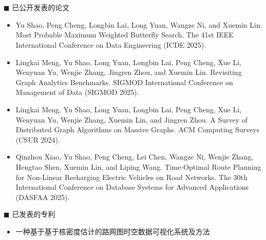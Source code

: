 \chapter*{}
\vskip 5mm

  {\heiti $\blacksquare$ 已公开发表的论文}\vskip 5mm

\begin{itemize}
  \item 
  Yu Shao, Peng Cheng, Longbin Lai, Long Yuan, Wangze Ni, and Xuemin Lin. Most Probable Maximum Weighted Butterfly Search. The 41st IEEE International Conference on Data Engineering (ICDE 2025).

  \item 
  Lingkai Meng, Yu Shao, Long Yuan, Longbin Lai, Peng Cheng, Xue Li, Wenyuan Yu, Wenjie Zhang, Jingren Zhou, and Xuemin Lin. Revisiting Graph Analytics Benchmarks. SIGMOD International Conference on Management of Data (SIGMOD 2025).

  \item 
  Lingkai Meng, Yu Shao, Long Yuan, Longbin Lai, Peng Cheng, Xue Li, Wenyuan Yu, Wenjie Zhang, Xuemin Lin, and Jingren Zhou. A Survey of Distributed Graph Algorithms on Massive Graphs. ACM Computing Surveys (CSUR 2024).

  \item 
  Qinzhou Xiao, Yu Shao, Peng Cheng, Lei Chen, Wangze Ni, Wenjie Zhang, Hengtao Shen, Xuemin Lin, and Liping Wang. Time-Optimal Route Planning for Non-Linear Recharging Electric Vehicles on Road Networks. The 30th International Conference on Database Systems for Advanced Applications (DASFAA 2025).
\end{itemize}

\bigskip\bigskip

{\heiti $\blacksquare$ 已发表的专利}\vskip 5mm

\begin{itemize}
  \item 一种基于基于核密度估计的路网图时空数据可视化系统及方法
\end{itemize}
